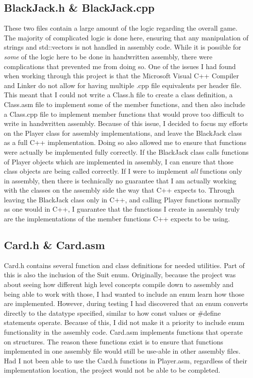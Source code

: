 \documentclass[twoside]{article}
\begin{document}
    \subsection{BlackJack.h \& BlackJack.cpp}\label{subsec:blackjack.h-&-blackjack.cpp}
    These two files contain a large amount of the logic regarding the overall game.
    The majority of complicated logic is done here, ensuring that any manipulation of strings and std::vectors is not handled in assembly code.
    While it is possible for \emph{some} of the logic here to be done in handwritten assembly, there were complications that prevented me from doing so.
    \bigbreak
    \noindent
    One of the issues I had found when working through this project is that the Microsoft Visual C++ Compiler and Linker do not allow for having multiple .cpp file equivalents per header file.
    This meant that I could not write a Class.h file to create a class definition, a Class.asm file to implement some of the member functions, and then also include a Class.cpp file to implement member functions that would prove too difficult to write in handwritten assembly.
    Because of this issue, I decided to focus my efforts on the Player class for assembly implementations, and leave the BlackJack class as a full C++ implementation.
    \bigbreak
    \noindent
    Doing so also allowed me to ensure that functions were actually be implemented fully correctly.
    If the BlackJack class calls functions of Player objects which are implemented in assembly, I can ensure that those class objects are being called correctly.
    If I were to implement \emph{all} functions only in assembly, then there is technically no guarantee that I am actually working with the classes on the assembly side the way that C++ expects to.
    Through leaving the BlackJack class only in C++, and calling Player functions normally as one would in C++, I guarantee that the functions I create in assembly truly are the implementations of the member functions C++ expects to be using.

    \subsection{Card.h \& Card.asm}\label{subsec:card.h-card.cpp-&-card.asm}
    Card.h contains several function and class definitions for needed utilities.
    Part of this is also the inclusion of the Suit enum.
    Originally, because the project was about seeing how different high level concepts compile down to assembly and being able to work with those, I had wanted to include an enum learn how those are implemented.
    However, during testing I had discovered that an enum converts directly to the datatype specified, similar to how const values or \#define statements operate.
    Because of this, I did not make it a priority to include enum functionality in the assembly code.
    \bigbreak
    \noindent
    Card.asm implements functions that operate on structures.
    The reason these functions exist is to ensure that functions implemented in one assembly file would still be use-able in other assembly files.
    Had I not been able to use the Card.h functions in Player.asm, regardless of their implementation location, the project would not be able to be completed.
\end{document}
